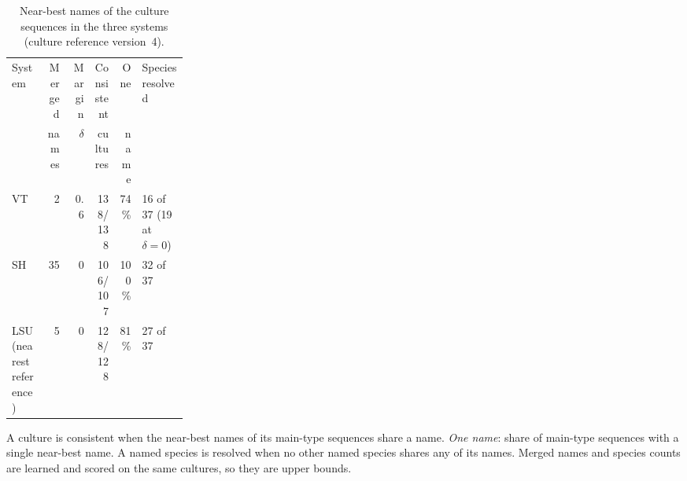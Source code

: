\begin{table}[htbp]\centering
\begin{threeparttable}
\caption{Near-best names of the culture sequences in the three systems (culture reference version~4).}
\label{tab:sets}
\footnotesize\setlength{\tabcolsep}{4pt}
\begin{tabular}{lrrrrp{0.26\linewidth}}
\toprule
System & Merged & Margin & Consistent & One & Species resolved\\
 & names & $\delta$ & cultures & name & \\
\midrule
VT                      & 2  & 0.6 & 138/138 & 74\%  & 16 of 37 (19 at $\delta=0$)\\
SH                      & 35 & 0   & 106/107 & 100\% & 32 of 37\\
LSU (nearest reference) & 5  & 0   & 128/128 & 81\%  & 27 of 37\\
\bottomrule
\end{tabular}
\begin{tablenotes}\footnotesize
\item A culture is consistent when the near-best names of its main-type sequences share a name. \emph{One name}: share of
main-type sequences with a single near-best name. A named species is resolved when no other named species shares any of its names.
Merged names and species counts are learned and scored on the same cultures, so they are upper bounds.
\end{tablenotes}
\end{threeparttable}
\end{table}
